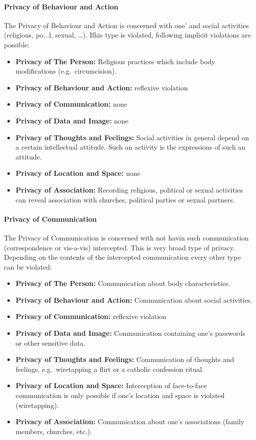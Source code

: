 \paragraph*{Privacy of Behaviour and Action}
The Privacy of Behaviour and Action is concerned with one' and social activities (religious, po...l, sexual, \ldots). Ifhis type is violated, following implicit violations are possible:
\begin{itemize}
\item
  \textbf{Privacy of The Person:} Religious practices which include body
  modifications (e.g.~circumcision).
\item
  \textbf{Privacy of Behaviour and Action:} reflexive violation
\item
  \textbf{Privacy of Communication:} none
\item
  \textbf{Privacy of Data and Image:} none
\item
  \textbf{Privacy of Thoughts and Feelings:} Social activities in
  general depend on a certain intellectual attitude. Such an activity is
  the expressions of such an attitude.
\item
  \textbf{Privacy of Location and Space:} none
\item
  \textbf{Privacy of Association:} Recording religious, political or
  sexual activities can reveal association with churches, political
  parties or sexual partners.
\end{itemize}

\paragraph*{Privacy of Communication}

The Privacy of Communication is concerned with not havin such
communication (correspondence or vis-a-vis) intercepted. This is very
broad type of privacy. Depending on the contents of the intercepted
communication every other type can be violated:

\begin{itemize}

\item
  \textbf{Privacy of The Person:} Communication about body
  characteristics.
\item
  \textbf{Privacy of Behaviour and Action:} Communication about social
  activities.
\item
  \textbf{Privacy of Communication:} reflexive violation
\item
  \textbf{Privacy of Data and Image:} Communication containing one's
  passwords or other sensitive data.
\item
  \textbf{Privacy of Thoughts and Feelings:} Communication of thoughts
  and feelings, e.g.~wiretapping a flirt or a catholic confession
  ritual.
\item
  \textbf{Privacy of Location and Space:} Interception of face-to-face
  communication is only possible if one's location and space is violated
  (wiretapping).
\item
  \textbf{Privacy of Association:} Communication about one's
  associations (family members, churches, etc.).
\end{itemize}

